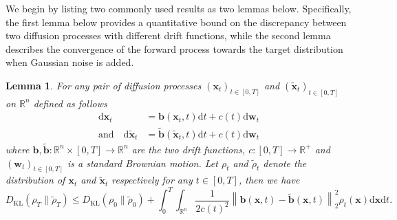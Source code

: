 \documentclass{article}
\numberwithin{equation}{section}
\newtheorem{lemma}[theorem]{Lemma}
\newcommand{\dif}{{\mathrm{d}}}
\def\vb{{\bm{b}}}
\def\vw{{\bm{w}}}
\def\vx{{\bm{x}}}
\newcommand{\KL}{D_{\mathrm{KL}}}
\begin{document}
We begin by listing two commonly used results as two lemmas below. Specifically, the first lemma below provides a quantitative bound on the discrepancy between two diffusion processes with different drift functions, while the second lemma describes the convergence of the forward process towards the target distribution when Gaussian noise is added. 
\begin{lemma}
    \label{lem: discrepancy between two diffusion processes}
    For any pair of diffusion processes $(\vx_t)_{t \in [0,T]}$ and $(\widetilde{\vx}_t)_{t \in [0,T]}$ on $\mathbb{R}^n$ defined as follows
    \begin{equation}
    \label{eqn: pair of diffusion processes in lemma}
    \begin{aligned}
    \dif \vx_t &= \vb(\vx_t,t)\dif t + c(t)\dif\vw_t\\
    \text{and}\quad \dif \widetilde{\vx}_t &= \widetilde{\vb}(\widetilde{\vx}_t,t)\dif t + c(t)\dif\vw_t
    \end{aligned}    
    \end{equation}
    where $\vb,\widetilde{\vb}:\mathbb{R}^n \times [0,T] \rightarrow \mathbb{R}^n$ are the two drift functions, $c:[0,T] \rightarrow \mathbb{R}^+$ and $(\vw_t)_{t \in [0,T]}$ is a standard Brownian motion. Let $\rho_t$ and $\widetilde{\rho}_t$ denote the distribution of $\vx_t$ and $\widetilde{\vx}_t$ respectively for any $t \in [0,T]$, then we have
    \begin{equation}
    \label{eqn: final bound on KL divergence}
    \KL(\rho_T \| \widetilde{\rho}_T) \leq \KL(\rho_0 \| \widetilde{\rho}_0) + \int_{0}^{T}\int_{\mathbb{R}^n}\frac{1}{2c(t)^2}\left\|\vb(\vx,t)-\widetilde{\vb}(\vx,t)\right\|_2^2\rho_t(\vx)\dif\vx\dif t.
    \end{equation}
\end{lemma}
\end{document}

